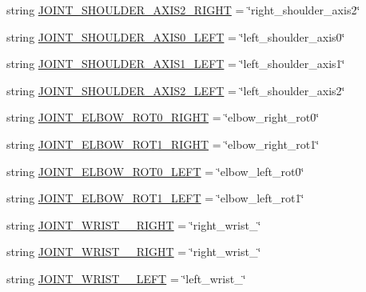 \begin{DoxyCompactItemize}
string \mbox{\hyperlink{namespacesteering__simulation_a11b82fa8fdda843272cc39e43abc48e5}{J\+O\+I\+N\+T\+\_\+\+S\+H\+O\+U\+L\+D\+E\+R\+\_\+\+A\+X\+I\+S2\+\_\+\+R\+I\+G\+HT}} = \char`\"{}right\+\_\+shoulder\+\_\+axis2\char`\"{}
\item 
string \mbox{\hyperlink{namespacesteering__simulation_a349c0f63ddcdf619cf509dceff5f53a6}{J\+O\+I\+N\+T\+\_\+\+S\+H\+O\+U\+L\+D\+E\+R\+\_\+\+A\+X\+I\+S0\+\_\+\+L\+E\+FT}} = \char`\"{}left\+\_\+shoulder\+\_\+axis0\char`\"{}
\item 
string \mbox{\hyperlink{namespacesteering__simulation_a613bf71b0e0c3452f92b4853e2e62220}{J\+O\+I\+N\+T\+\_\+\+S\+H\+O\+U\+L\+D\+E\+R\+\_\+\+A\+X\+I\+S1\+\_\+\+L\+E\+FT}} = \char`\"{}left\+\_\+shoulder\+\_\+axis1\char`\"{}
\item 
string \mbox{\hyperlink{namespacesteering__simulation_ad9da62cd2eb0c4000d1fc4eda6017364}{J\+O\+I\+N\+T\+\_\+\+S\+H\+O\+U\+L\+D\+E\+R\+\_\+\+A\+X\+I\+S2\+\_\+\+L\+E\+FT}} = \char`\"{}left\+\_\+shoulder\+\_\+axis2\char`\"{}
\item 
string \mbox{\hyperlink{namespacesteering__simulation_a87ec11ba1fc1588a0cd2cc310e9dd12d}{J\+O\+I\+N\+T\+\_\+\+E\+L\+B\+O\+W\+\_\+\+R\+O\+T0\+\_\+\+R\+I\+G\+HT}} = \char`\"{}elbow\+\_\+right\+\_\+rot0\char`\"{}
\item 
string \mbox{\hyperlink{namespacesteering__simulation_a1a8aae1f17bde6bb8d80c73e7f546434}{J\+O\+I\+N\+T\+\_\+\+E\+L\+B\+O\+W\+\_\+\+R\+O\+T1\+\_\+\+R\+I\+G\+HT}} = \char`\"{}elbow\+\_\+right\+\_\+rot1\char`\"{}
\item 
string \mbox{\hyperlink{namespacesteering__simulation_a6bc051ea14ae98684ec54faf12a80d18}{J\+O\+I\+N\+T\+\_\+\+E\+L\+B\+O\+W\+\_\+\+R\+O\+T0\+\_\+\+L\+E\+FT}} = \char`\"{}elbow\+\_\+left\+\_\+rot0\char`\"{}
\item 
string \mbox{\hyperlink{namespacesteering__simulation_a95ae3d26f956b491229c78d10dee1aba}{J\+O\+I\+N\+T\+\_\+\+E\+L\+B\+O\+W\+\_\+\+R\+O\+T1\+\_\+\+L\+E\+FT}} = \char`\"{}elbow\+\_\+left\+\_\+rot1\char`\"{}
\item 
string \mbox{\hyperlink{namespacesteering__simulation_a97c26a57b04116975fbd66982ffe0477}{J\+O\+I\+N\+T\+\_\+\+W\+R\+I\+S\+T\+\_\+\_\+\+R\+I\+G\+HT}} = \char`\"{}right\+\_\+wrist\+\_\char`\"{}
\item 
string \mbox{\hyperlink{namespacesteering__simulation_a1ff71de09a5b70901b4321e8cf68d061}{J\+O\+I\+N\+T\+\_\+\+W\+R\+I\+S\+T\+\_\+\_\+\+R\+I\+G\+HT}} = \char`\"{}right\+\_\+wrist\+\_\char`\"{}
\item 
string \mbox{\hyperlink{namespacesteering__simulation_a1292b9f1429c017d07ec3de6b2f0a7bf}{J\+O\+I\+N\+T\+\_\+\+W\+R\+I\+S\+T\+\_\+\_\+\+L\+E\+FT}} = \char`\"{}left\+\_\+wrist\+\_\char`\"{}

\end{DoxyCompactItemize}

